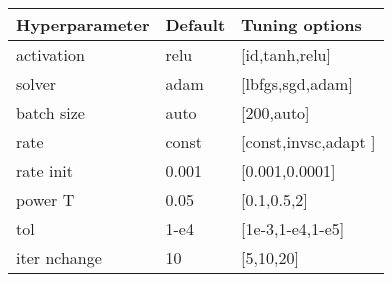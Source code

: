 
\begin{tabular}{|l|l|l|} 
\hline
\textbf{Hyperparameter}& \textbf{Default} & \textbf{Tuning options}\\
\hline
activation & relu & [id,tanh,relu] \\
\hline
solver & adam & [lbfgs,sgd,adam] \\
\hline
batch size & auto & [200,auto] \\
\hline
rate & const& [const,invsc,adapt ] \\
\hline
rate init & 0.001 & [0.001,0.0001] \\
\hline
power T & 0.05 & [0.1,0.5,2] \\
\hline
tol & 1-e4& [1e-3,1-e4,1-e5] \\
\hline
iter nchange & 10& [5,10,20] \\
\hline
\end{tabular}
